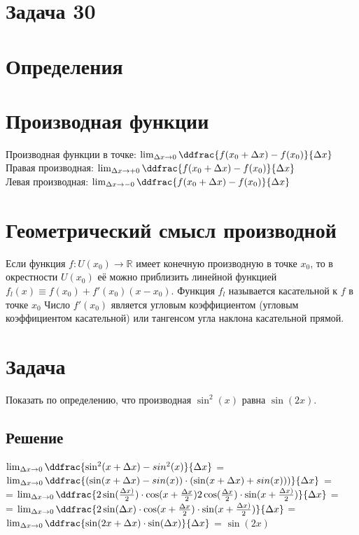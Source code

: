 
\section*{Задача 30}
\section*{Определения}
\section*{Производная функции}
	Производная функции в точке:
	$\lim _{{\Delta x\to 0}}{\ddfrac  {f(x_{0}+\Delta x)-f(x_{0})}{\Delta x}}$\\
	Правая производная:
	$\lim _{{\Delta x\to +0}}{\ddfrac  {f(x_{0}+\Delta x)-f(x_{0})}{\Delta x}}$\\
	Левая производная:
	$\lim _{{\Delta x\to -0}}{\ddfrac  {f(x_{0}+\Delta x)-f(x_{0})}{\Delta x}}$
\section*{Геометрический смысл производной}
	Если функция ${f\colon U(x_{0})\to \mathbb {R} }$
	  имеет конечную производную в точке $x_0$, то в окрестности
		 $U(x_{0})$ её можно приблизить линейной функцией
${f_{l}(x)\equiv f(x_{0})+f'(x_{0})(x-x_{0})}$.
Функция ${f_{l}}$ называется касательной к $f$
в точке $x_{0}$ Число ${f'(x_{0})}$
 является угловым коэффициентом (угловым коэффициентом касательной) или тангенсом угла наклона касательной прямой.
 \section*{Задача}
 Показать по определению, что производная $\sin^{2}(x)$ равна $\sin(2x)$.
 \subsection*{Решение}
 $\lim _{{\Delta x\to 0}}{\ddfrac{\sin^2(x+\Delta x)-sin^2(x)}{\Delta x}}$ =
 $\lim _{{\Delta x\to 0}}{\ddfrac{(\sin(x+\Delta x)-sin(x))\cdot
 (\sin(x+\Delta x)+sin(x)))}{\Delta x}}$ =\\=
 $\lim _{{\Delta x\to 0}}{\ddfrac{2\sin(\frac{\Delta x)}{2})\cdot\cos(x+\frac{\Delta x}{2})
 2\cos(\frac{\Delta x}{2}) \cdot\sin(x+\frac{\Delta x)}{2})
 }{\Delta x}}$ =\\= $\lim _{{\Delta x\to 0}}{\ddfrac{2\sin(\Delta x)\cdot\cos(x+\frac{\Delta x}{2})
 \cdot\sin(x+\frac{\Delta x)}{2})
 }{\Delta x}}$ = $\lim _{{\Delta x\to 0}}{\ddfrac{\sin(2x+\Delta x)\cdot\sin(\Delta x)}{\Delta x}}$
 = $\sin(2x)$


